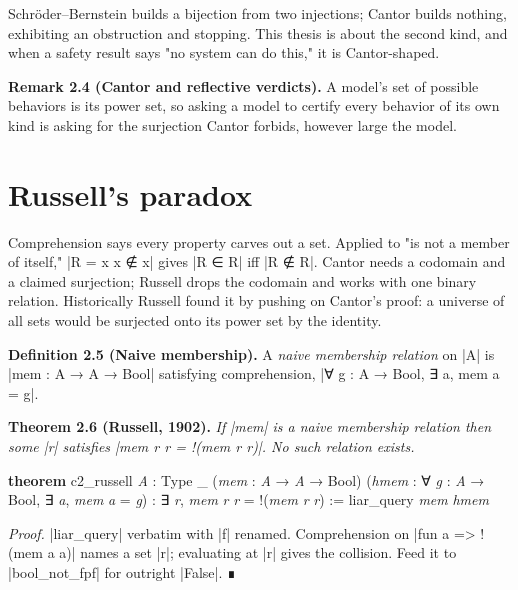 \documentclass{memoir}
\begin{document}
Schröder–Bernstein builds a bijection from two injections; Cantor builds
nothing, exhibiting an obstruction and stopping. This thesis is about the second
kind, and when a safety result says "no system can do this," it is
Cantor-shaped.

\textbf{Remark 2.4 (Cantor and reflective verdicts).} A model's set of possible behaviors is its
power set, so asking a model to certify every behavior of its own kind is asking
for the surjection Cantor forbids, however large the model.



\section{Russell's paradox}\label{Two--Schemas--of--Impossibility-005F-005F-005F--Machine--Checked--Limits--of--Trustworthy--Machine--Learning-005F-005F-005F--and--Why--They--Tighten--with--Capability----The--Classical--Limits----Russell-005F-005F-005Fs--paradox}

Comprehension says every property carves out a set. Applied to "is not a member
of itself," \LeanVerb|R = x  x ∉ x| gives \LeanVerb|R ∈ R| iff \LeanVerb|R ∉ R|. Cantor needs a codomain
and a claimed surjection; Russell drops the codomain and works with one binary
relation. Historically Russell found it by pushing on Cantor's proof: a universe
of all sets would be surjected onto its power set by the identity.

\textbf{Definition 2.5 (Naive membership).} A \emph{naive membership relation} on \LeanVerb|A| is
\LeanVerb|mem : A → A → Bool| satisfying comprehension, \LeanVerb|∀ g : A → Bool, ∃ a, mem a = g|.

\textbf{Theorem 2.6 (Russell, 1902).} \emph{If \LeanVerb|mem| is a naive membership relation then some
\LeanVerb|r| satisfies \LeanVerb|mem r r = !(mem r r)|. No such relation exists.}

\begin{LeanVerbatim}
\textbf{theorem} c2_russell \textit{A} : Type _ (\textit{mem} : \textit{A} → \textit{A} → Bool)
    (\textit{hmem} : ∀ \textit{g} : \textit{A} → Bool, ∃ \textit{a}, \textit{mem} \textit{a} = \textit{g}) :
    ∃ \textit{r}, \textit{mem} \textit{r} \textit{r} = !(\textit{mem} \textit{r} \textit{r}) :=
  liar_query \textit{mem} \textit{hmem}

\end{LeanVerbatim}


\emph{Proof.} \LeanVerb|liar_query| verbatim with \LeanVerb|f| renamed. Comprehension on
\LeanVerb|fun a => !(mem a a)| names a set \LeanVerb|r|; evaluating at \LeanVerb|r| gives the collision.
Feed it to \LeanVerb|bool_not_fpf| for outright \LeanVerb|False|. ∎
\end{document}
